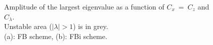 \documentclass[a4paper,11pt]{article}
\begin{document}
\begin{figure}[!ht]
   \centering
   \quad
   \caption {Amplitude of the largest eigenvalue as a function of $C_x\ =\ C_z$ and $C_\lambda$.\\
   Unstable area ($\mid\lambda\mid >1$) is in grey.\\
   (a): FB scheme, (b): FBi scheme. }
   \label{Figstabcslambda}
\end{figure}
\end{document}
